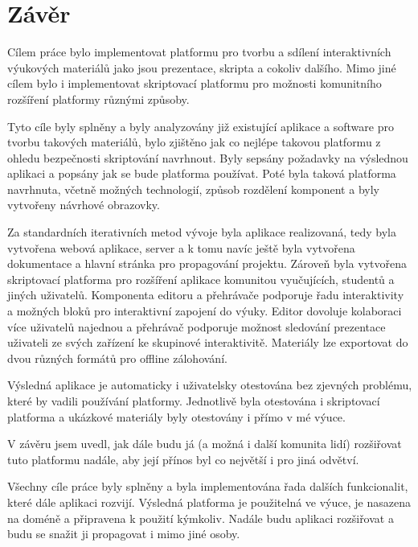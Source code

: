 \chapter*{Závěr}

Cílem práce bylo implementovat platformu pro tvorbu a sdílení interaktivních výukových materiálů jako jsou prezentace, skripta a cokoliv dalšího.
Mimo jiné cílem bylo i implementovat skriptovací platformu pro možnosti komunitního rozšíření platformy různými způsoby.

Tyto cíle byly splněny a byly analyzovány již existující aplikace a software pro tvorbu takových materiálů, bylo zjištěno jak co nejlépe takovou platformu z ohledu bezpečnosti skriptování navrhnout.
Byly sepsány požadavky na výslednou aplikaci a popsány jak se bude platforma používat.
Poté byla taková platforma navrhnuta, včetně možných technologií, způsob rozdělení komponent a byly vytvořeny návrhové obrazovky.

Za standardních iterativních metod vývoje byla aplikace realizovaná, tedy byla vytvořena webová aplikace, server a k tomu navíc ještě byla vytvořena dokumentace a hlavní stránka pro propagování projektu.
Zároveň byla vytvořena skriptovací platforma pro rozšíření aplikace komunitou vyučujících, studentů a jiných uživatelů.
Komponenta editoru a přehrávače podporuje řadu interaktivity a možných bloků pro interaktivní zapojení do výuky.
Editor dovoluje kolaboraci více uživatelů najednou a přehrávač podporuje možnost sledování prezentace uživateli ze svých zařízení ke skupinové interaktivitě.
Materiály lze exportovat do dvou různých formátů pro offline zálohování.

Výsledná aplikace je automaticky i uživatelsky otestována bez zjevných problému, které by vadili používání platformy.
Jednotlivě byla otestována i skriptovací platforma a ukázkové materiály byly otestovány i přímo v mé výuce.

V závěru jsem uvedl, jak dále budu já (a možná i další komunita lidí) rozšiřovat tuto platformu nadále, aby její přínos byl co největší i pro jiná odvětví.

Všechny cíle práce byly splněny a byla implementována řada dalších funkcionalit, které dále aplikaci rozvijí.
Výsledná platforma je použitelná ve výuce, je nasazena na doméně a připravena k použití kýmkoliv.
Nadále budu aplikaci rozšiřovat a budu se snažit ji propagovat i mimo jiné osoby.